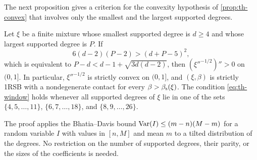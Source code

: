 The next proposition gives a criterion for the convexity hypothesis of \cref{prop:th-convex} that involves only the smallest and the largest supported degrees.

\begin{proposition}\label{prop:th-degree-window}
Let $\xi$ be a finite mixture whose smallest supported degree is $d\ge4$ and whose largest supported degree is $P$. If
\begin{equation}\label{eq:th-window}
6(d-2)(P-2)>(d+P-5)^2,
\end{equation}
which is equivalent to $P-d<d-1+\sqrt{3d(d-2)}$, then $(\xi''^{-1/2})''>0$ on $(0,1]$. In particular, $\xi''^{-1/2}$ is strictly convex on $(0,1]$, and $(\xi,\beta)$ is strictly 1RSB with a nondegenerate contact for every $\beta>\beta_{\mathrm s}(\xi)$. The condition \eqref{eq:th-window} holds whenever all supported degrees of $\xi$ lie in one of the sets $\{4,5,\dots,11\}$, $\{6,7,\dots,18\}$, and $\{8,9,\dots,26\}$.
\end{proposition}

The proof applies the Bhatia--Davis bound $\operatorname{Var}(I)\le(m-n)(M-m)$ for a random variable $I$ with values in $[n,M]$ and mean $m$ \cite{BhatiaDavis2000} to a tilted distribution of the degrees. No restriction on the number of supported degrees, their parity, or the sizes of the coefficients is needed.


